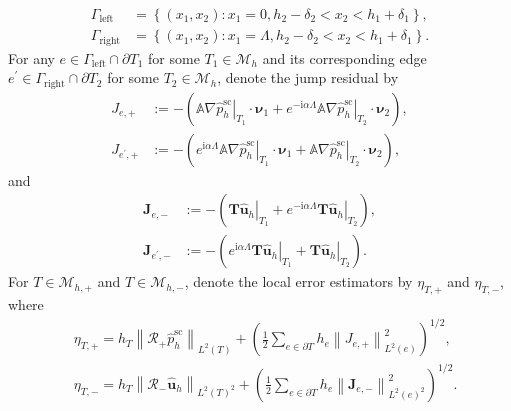 \documentclass[final,3p,times]{elsarticle}
\begin{document}
\begin{align*}
	\Gamma_{\text {left}} &=\left\{\left(x_1, x_2\right): x_1 =0, h_2-\delta_2<x_2<h_1+\delta_1\right\},\\
	\Gamma_{\text {right}} &=\left\{\left(x_1, x_2\right): x_1=\Lambda, h_2-\delta_2<x_2<h_1+\delta_1\right\}.
\end{align*}
For any $e \in\Gamma_{\text {left}} \cap \partial T_1$ for some $T_1 \in \mathscr{M}_h$ and its corresponding edge $e^{\prime} \in\Gamma_{\text {right}} \cap \partial T_2$  for some $T_2 \in \mathscr{M}_h$, denote the jump residual by
\begin{align*}
	J_{e, +}&:= - (\left.\mathbb{A} \nabla \hat{p}^{\mathrm{sc}}_h\right|_{T_1} \cdot \boldsymbol{\nu}_1 + e^{-\mathrm{i}\alpha \Lambda} \left.\mathbb{A} \nabla \hat{p}^{\mathrm{sc}}_h\right|_{T_2} \cdot \boldsymbol{\nu}_2),\\
	J_{e^{\prime}, +} &:= - (\left. e^{\mathrm{i}\alpha \Lambda} \mathbb{A} \nabla \hat{p}^{\mathrm{sc}}_h\right|_{T_1} \cdot \boldsymbol{\nu}_1 + \left.\mathbb{A} \nabla \hat{p}^{\mathrm{sc}}_h\right|_{T_2} \cdot \boldsymbol{\nu}_2),
\end{align*}
and
\begin{align*}
	\boldsymbol{J}_{e, -}&:=  -\left(\left.\boldsymbol{T} \hat{\boldsymbol{u}}_h\right|_{T_1}+\left.e^{-\mathrm{i} \alpha \Lambda} \boldsymbol{T} \hat{\boldsymbol{u}}_h\right|_{T_2}\right), \\
	\boldsymbol{J}_{e^{\prime}, -} &:=  -\left(\left.e^{\mathrm{i} \alpha \Lambda} \boldsymbol{T} \hat{\boldsymbol{u}}_h\right|_{T_1}+\left.\boldsymbol{T} \hat{\boldsymbol{u}}_h\right|_{T_2}\right).
\end{align*}
For $T \in \mathscr{M}_{h, +}$ and $T \in \mathscr{M}_{h, -}$, denote the local error estimators by $\eta_{T, +}$ and $\eta_{T, -}$, where
\begin{align}
	& \eta_{T, +}=h_T\left\|\mathcal{R}_+  \hat{p}^{\mathrm{sc}}_h\right\|_{L^2(T)}+\left(\frac{1}{2} \sum_{e \in \partial T} h_e\left\|J_{e, +}\right\|_{L^2(e)}^2\right)^{1 / 2}, \label{eta1}\\
	& \eta_{T, -}=h_T\left\|\mathcal{R}_- \hat{\boldsymbol{u}}_h\right\|_{L^2(T)^2}+\left(\frac{1}{2} \sum_{e \in \partial T} h_e\left\|\boldsymbol{J}_{e, -}\right\|_{L^2(e)^2}^2\right)^{1 / 2}.\label{eta2}
\end{align}
\end{document}
